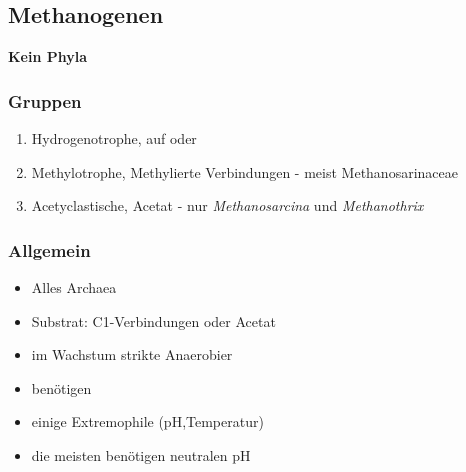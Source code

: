 \subsection{Methanogenen}
\textbf{Kein Phyla}

\subsubsection*{Gruppen}
\begin{enumerate}
	\item Hydrogenotrophe, auf  oder 
	\item Methylotrophe, Methylierte Verbindungen - meist Methanosarinaceae
	\item Acetyclastische, Acetat - nur \textsl{Methanosarcina} und \textsl{Methanothrix}
\end{enumerate}

\subsubsection*{Allgemein}
\begin{itemize}
	\item Alles Archaea
	\item Substrat: C1-Verbindungen oder Acetat
	\item im Wachstum strikte Anaerobier
	\item benötigen 
	\item einige Extremophile (pH,Temperatur)
	\item die meisten benötigen neutralen pH
\end{itemize}
